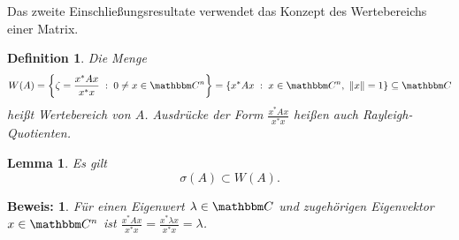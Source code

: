 \documentclass[12pt,a4paper]{book}
\theoremstyle{break}
\newtheorem{lemma}[theorem]{Lemma}
\newtheorem{definition}[theorem]{Definition}
\theoremstyle{nonumberplain}
\newtheorem{beweis}{Beweis:}
\newcommand{\C}{\mathbbm C}
\newcommand{\norm}[1]{\left\Vert#1\right\Vert}		%
\newcommand{\1}{\mathbbm{1}} 			      	%
\newcommand{\dd}{\; : \;}    			      	%
\begin{document}
Das zweite Einschließungsresultate verwendet das Konzept des Wertebereichs einer Matrix.
\begin{definition}
Die Menge
\[
W(A)=\left\{ \zeta=\frac{x^* A x}{x^* x} \dd 0\neq x\in \C^n \right\}=\left\{ x^* A x \dd x\in \C^n,\ \norm{x}=1\right\}\subseteq \C
\]
heißt \emph{Wertebereich} von $A$. Ausdrücke der Form $\frac{x^* A x}{x^* x}$ heißen auch \emph{Rayleigh-Quotienten}.
\end{definition}


\begin{lemma}\label{lemma:W_enthaelt_sigma}
Es gilt
\[
\sigma(A)\subset W(A).
\]
\end{lemma}
\begin{beweis}
Für einen Eigenwert $\lambda\in \C$ und zugehörigen Eigenvektor $x\in \C^n$ ist
$\frac{x^* A x}{x^*x}=\frac{x^* \lambda x}{x^*x}=\lambda$. 
\end{beweis}
\end{document}
